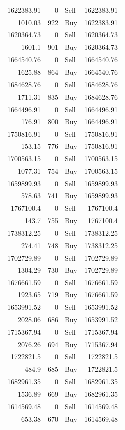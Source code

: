 \begin{longtable}{rrlr}
1622383.91 & 0 & Sell & 1622383.91 \\
1010.03 & 922 & Buy & 1622383.91 \\
1620364.73 & 0 & Sell & 1620364.73 \\
1601.1 & 901 & Buy & 1620364.73 \\
1664540.76 & 0 & Sell & 1664540.76 \\
1625.88 & 864 & Buy & 1664540.76 \\
1684628.76 & 0 & Sell & 1684628.76 \\
1711.31 & 835 & Buy & 1684628.76 \\
1664496.91 & 0 & Sell & 1664496.91 \\
176.91 & 800 & Buy & 1664496.91 \\
1750816.91 & 0 & Sell & 1750816.91 \\
153.15 & 776 & Buy & 1750816.91 \\
1700563.15 & 0 & Sell & 1700563.15 \\
1077.31 & 754 & Buy & 1700563.15 \\
1659899.93 & 0 & Sell & 1659899.93 \\
578.63 & 741 & Buy & 1659899.93 \\
1767100.4 & 0 & Sell & 1767100.4 \\
143.7 & 755 & Buy & 1767100.4 \\
1738312.25 & 0 & Sell & 1738312.25 \\
274.41 & 748 & Buy & 1738312.25 \\
1702729.89 & 0 & Sell & 1702729.89 \\
1304.29 & 730 & Buy & 1702729.89 \\
1676661.59 & 0 & Sell & 1676661.59 \\
1923.65 & 719 & Buy & 1676661.59 \\
1653991.52 & 0 & Sell & 1653991.52 \\
2028.06 & 686 & Buy & 1653991.52 \\
1715367.94 & 0 & Sell & 1715367.94 \\
2076.26 & 694 & Buy & 1715367.94 \\
1722821.5 & 0 & Sell & 1722821.5 \\
484.9 & 685 & Buy & 1722821.5 \\
1682961.35 & 0 & Sell & 1682961.35 \\
1536.89 & 669 & Buy & 1682961.35 \\
1614569.48 & 0 & Sell & 1614569.48 \\
653.38 & 670 & Buy & 1614569.48 \\

\end{longtable}
